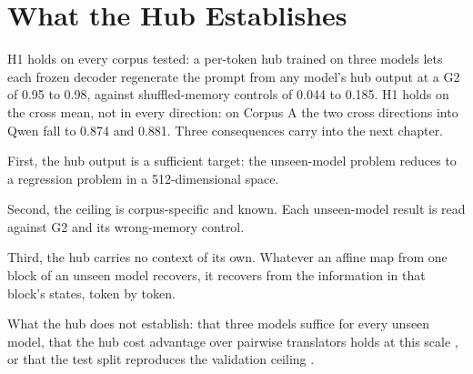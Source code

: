 \section{What the Hub Establishes}\label{sec:hub:discussion}

H1 holds on every corpus tested: a per-token hub trained on three models lets each frozen decoder regenerate the prompt from any model's hub output at a G2 of 0.95 to 0.98, against shuffled-memory controls of 0.044 to 0.185. H1 holds on the cross mean, not in every direction: on Corpus A the two cross directions into Qwen fall to 0.874 and 0.881. Three consequences carry into the next chapter.

First, the hub output is a sufficient target: the unseen-model problem reduces to a regression problem in a 512-dimensional space.

Second, the ceiling is corpus-specific and known. Each unseen-model result is read against G2 and its wrong-memory control.

Third, the hub carries no context of its own. Whatever an affine map from one block of an unseen model recovers, it recovers from the information in that block's states, token by token.

What the hub does not establish: that three models suffice for every unseen model, that the hub cost advantage over pairwise translators holds at this scale , or that the test split reproduces the validation ceiling .
